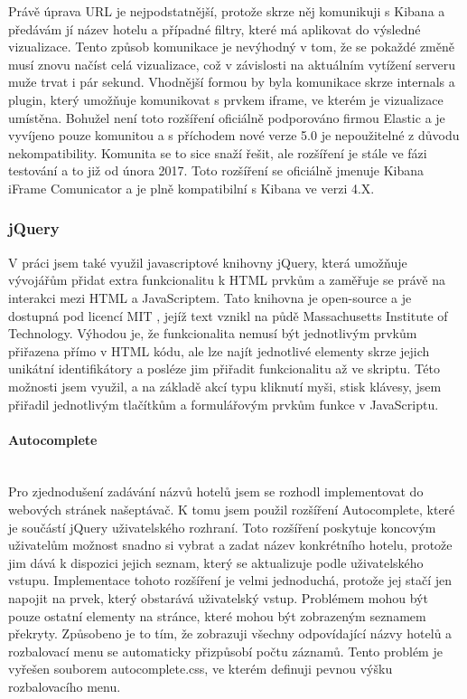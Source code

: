 \documentclass[czech,BP]{thesiskiv}
\begin{document}
Právě úprava URL je nejpodstatnější, protože skrze něj komunikuji s Kibana a předávám jí název hotelu a případné filtry, které má aplikovat do výsledné vizualizace. Tento způsob komunikace je nevýhodný v tom, že se pokaždé změně musí znovu načíst celá vizualizace, což v závislosti na aktuálním vytížení serveru muže trvat i pár sekund. Vhodnější formou by byla komunikace skrze internals a plugin, který umožňuje komunikovat s prvkem iframe, ve kterém je vizualizace umístěna. Bohužel není toto rozšíření oficiálně podporováno firmou Elastic a je vyvíjeno pouze komunitou a s příchodem nové verze 5.0 je nepoužitelné z důvodu nekompatibility. Komunita se to sice snaží řešit, ale rozšíření je stále ve fázi testování a to již od února 2017. Toto rozšíření se oficiálně jmenuje Kibana iFrame Comunicator a je plně kompatibilní s Kibana ve verzi 4.X.

\subsubsection{jQuery}
V práci jsem také využil javascriptové knihovny jQuery, která umožňuje vývojářům přidat extra funkcionalitu k HTML prvkům a zaměřuje se právě na interakci mezi HTML a JavaScriptem. Tato knihovna je open-source a je dostupná pod licencí MIT\cite{jQuery} , jejíž text vznikl na půdě Massachusetts  Institute of Technology.\cite{MIT_licence} Výhodou je, že funkcionalita nemusí být jednotlivým prvkům přiřazena přímo v HTML kódu, ale lze najít jednotlivé elementy skrze jejich unikátní identifikátory a posléze jim přiřadit funkcionalitu až ve skriptu. Této možnosti jsem využil, a na základě akcí typu kliknutí myši, stisk klávesy, jsem přiřadil jednotlivým tlačítkům a formulářovým prvkům funkce v JavaScriptu.

\paragraph{Autocomplete}
\mbox{}\\
Pro zjednodušení zadávání názvů hotelů jsem se rozhodl implementovat do webových stránek našeptávač. K tomu jsem použil rozšíření Autocomplete, které je součástí jQuery uživatelského rozhraní. Toto rozšíření poskytuje koncovým uživatelům možnost snadno si vybrat a zadat název konkrétního hotelu, protože jim dává k dispozici jejich seznam, který se aktualizuje podle uživatelského vstupu. Implementace tohoto rozšíření je velmi jednoduchá, protože jej stačí jen napojit na prvek, který obstarává uživatelský vstup. Problémem mohou být pouze ostatní elementy na stránce, které mohou být zobrazeným seznamem překryty. Způsobeno je to tím, že zobrazuji všechny odpovídající názvy hotelů a rozbalovací menu se automaticky přizpůsobí počtu záznamů. Tento problém je vyřešen souborem autocomplete.css, ve kterém definuji pevnou výšku rozbalovacího menu.
\end{document}
